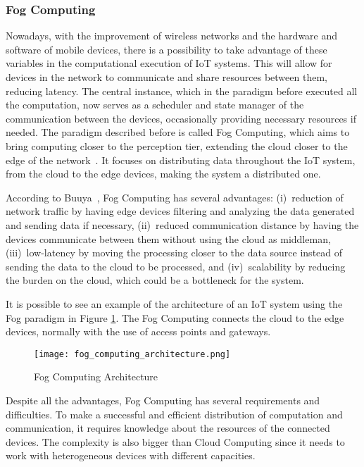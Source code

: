 \subsubsection{Fog Computing}\label{sec:fog_computing}

Nowadays, with the improvement of wireless networks and the hardware and software of mobile devices, there is a possibility to take advantage of these variables in the computational execution of IoT systems. This will allow for devices in the network to communicate and share resources between them, reducing latency. The central instance, which in the paradigm before executed all the computation, now serves as a scheduler and state manager of the communication between the devices, occasionally providing necessary resources if needed. The paradigm described before is called Fog Computing, which aims to bring computing closer to the perception tier, extending the cloud closer to the edge of the network~\cite{mobile_cloud}. It focuses on distributing data throughout the IoT system, from the cloud to the edge devices, making the system a distributed one.

According to Buuya~\cite{IoT_principles_and_paradigms}, Fog Computing has several advantages: (i)~reduction of network traffic by having edge devices filtering and analyzing the data generated and sending data if necessary, (ii)~reduced communication distance by having the devices communicate between them without using the cloud as middleman, (iii)~low-latency by moving the processing closer to the data source instead of sending the data to the cloud to be processed, and (iv)~scalability by reducing the burden on the cloud, which could be a bottleneck for the system.

It is possible to see an example of the architecture of an IoT system using the Fog paradigm in Figure \ref{fig:fog_architecture}. The Fog Computing connects the cloud to the edge devices, normally with the use of access points and gateways. 

\begin{figure}[h]
\caption[Fog Computing Architecture]{Fog Computing Architecture~\cite{IoT_principles_and_paradigms}}
\label{fig:fog_architecture}
\centering
\texttt{[image: fog\_computing\_architecture.png]}
\end{figure}

Despite all the advantages, Fog Computing has several requirements and difficulties. To make a successful and efficient distribution of computation and communication, it requires knowledge about the resources of the connected devices. The complexity is also bigger than Cloud Computing since it needs to work with heterogeneous devices with different capacities. 
       
